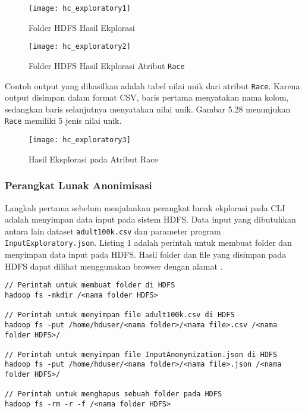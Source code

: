 \begin{figure}[H]
	\centering
	\texttt{[image: hc\_exploratory1]}
	\caption{Folder HDFS Hasil Ekplorasi}
	\label{fig:pertama2}
\end{figure}

\begin{figure}[H]
	\centering
	\texttt{[image: hc\_exploratory2]}
	\caption{Folder HDFS Hasil Ekplorasi Atribut \texttt{Race}}
	\label{fig:pertama2}
\end{figure}

Contoh output yang dihasilkan adalah tabel nilai unik dari atribut \texttt{Race}. Karena output disimpan dalam format CSV, baris pertama menyatakan nama kolom, sedangkan baris selanjutnya menyatakan nilai unik. Gambar 5.28 menunjukan \texttt{Race} memiliki 5 jenis nilai unik.

\begin{figure}[H]
	\centering
	\texttt{[image: hc\_exploratory3]}
	\caption{Hasil Eksplorasi pada Atribut Race}
	\label{fig:pertama2}
\end{figure}

\newpage
\subsubsection{Perangkat Lunak Anonimisasi}
Langkah pertama sebelum menjalankan perangkat lunak ekplorasi pada CLI adalah menyimpan data input pada sistem HDFS. Data input yang dibutuhkan antara lain dataset \texttt{adult100k.csv} dan parameter program \texttt{InputExploratory.json}. Listing 1 adalah perintah untuk membuat folder dan menyimpan data input pada HDFS. Hasil folder dan file yang disimpan pada HDFS dapat dilihat menggunakan browser dengan alamat .

\begin{lstlisting}[basicstyle=\ttfamily, frame=single,
	columns=fullflexible, keepspaces=true, breaklines=true, label=lst:pl_csv, caption=Perintah Spark untuk Perangkat Lunak Anonimisasi]
// Perintah untuk membuat folder di HDFS
hadoop fs -mkdir /<nama folder HDFS>

// Perintah untuk menyimpan file adult100k.csv di HDFS
hadoop fs -put /home/hduser/<nama folder>/<nama file>.csv /<nama folder HDFS>/

// Perintah untuk menyimpan file InputAnonymization.json di HDFS
hadoop fs -put /home/hduser/<nama folder>/<nama file>.json /<nama folder HDFS>/

// Perintah untuk menghapus sebuah folder pada HDFS
hadoop fs -rm -r -f /<nama folder HDFS>

\end{lstlisting}

